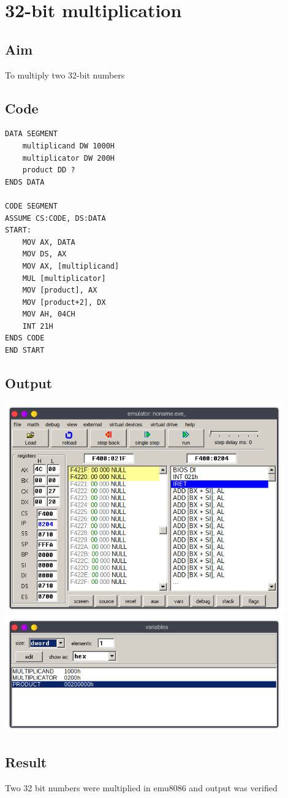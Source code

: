 \section{32-bit multiplication}
\subsection{Aim}
To multiply two 32-bit numbers

\subsection{Code}
\begin{lstlisting}
DATA SEGMENT
	multiplicand DW 1000H
	multiplicator DW 200H
	product DD ?
ENDS DATA 

CODE SEGMENT
ASSUME CS:CODE, DS:DATA
START:
	MOV AX, DATA
	MOV DS, AX
	MOV AX, [multiplicand]
	MUL [multiplicator]
	MOV [product], AX
	MOV [product+2], DX
    MOV AH, 04CH
    INT 21H
ENDS CODE
END START
\end{lstlisting}

\subsection{Output}
\begin{center}
	\includegraphics[width=0.90\textwidth]{img/p5/ss1.png}
	\includegraphics[width=0.90\textwidth]{img/p5/ss2.png}
\end{center}

\subsection{Result}
Two 32 bit numbers were multiplied in emu8086 and output was verified